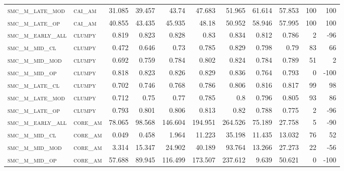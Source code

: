 \begin{landscape}
\begin{center}
\begin{footnotesize}
\begin{longtable}{llrrrrrr|rrr}
\textsc{smc\_m\_late\_mod } & \textsc{cai\_am   }   & 31.085   & 39.457   & 43.74    & 47.683   & 51.965   & 61.614      & 57.853        & 100           & 100      \\
\textsc{smc\_m\_late\_op  } & \textsc{cai\_am   }   & 40.855   & 43.435   & 45.935   & 48.18    & 50.952   & 58.946      & 57.995        & 100           & 100      \\
\textsc{smc\_m\_early\_all} & \textsc{clumpy    }   & 0.819    & 0.823    & 0.828    & 0.83     & 0.834    & 0.812       & 0.786         & 2             & -96      \\
\textsc{smc\_m\_mid\_cl   } & \textsc{clumpy    }   & 0.472    & 0.646    & 0.73     & 0.785    & 0.829    & 0.798       & 0.79          & 83            & 66       \\
\textsc{smc\_m\_mid\_mod  } & \textsc{clumpy    }   & 0.692    & 0.759    & 0.784    & 0.802    & 0.824    & 0.784       & 0.789         & 51            & 2        \\
\textsc{smc\_m\_mid\_op   } & \textsc{clumpy    }   & 0.818    & 0.823    & 0.826    & 0.829    & 0.836    & 0.764       & 0.793         & 0             & -100     \\
\textsc{smc\_m\_late\_cl  } & \textsc{clumpy    }   & 0.702    & 0.746    & 0.768    & 0.786    & 0.806    & 0.816       & 0.817         & 99            & 98       \\
\textsc{smc\_m\_late\_mod } & \textsc{clumpy    }   & 0.712    & 0.75     & 0.77     & 0.785    & 0.8      & 0.796       & 0.805         & 93            & 86       \\
\textsc{smc\_m\_late\_op  } & \textsc{clumpy    }   & 0.793    & 0.801    & 0.806    & 0.813    & 0.82     & 0.788       & 0.775         & 2             & -96      \\
\textsc{smc\_m\_early\_all} & \textsc{core\_am  }   & 78.065   & 98.568   & 146.604  & 194.951  & 264.526  & 75.189      & 27.758        & 5             & -90      \\
\textsc{smc\_m\_mid\_cl   } & \textsc{core\_am  }   & 0.049    & 0.458    & 1.964    & 11.223   & 35.198   & 11.435      & 13.032        & 76            & 52       \\
\textsc{smc\_m\_mid\_mod  } & \textsc{core\_am  }   & 3.314    & 15.347   & 24.902   & 40.189   & 93.764   & 13.266      & 27.273        & 22            & -56      \\
\textsc{smc\_m\_mid\_op   } & \textsc{core\_am  }   & 57.688   & 89.945   & 116.499  & 173.507  & 237.612  & 9.639       & 50.621        & 0             & -100     \\

\end{longtable}
\end{footnotesize}
\end{center}
\end{landscape}
